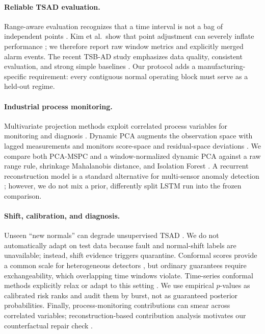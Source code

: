 \documentclass{article}
\begin{document}
\paragraph{Reliable TSAD evaluation.}
Range-aware evaluation recognizes that a time interval is not a bag of independent points \cite{tatbul2018precision}. Kim et al.\ show that point adjustment can severely inflate performance \cite{kim2022rigorous}; we therefore report raw window metrics and explicitly merged alarm events. The recent TSB-AD study emphasizes data quality, consistent evaluation, and strong simple baselines \cite{liu2024elephant}. Our protocol adds a manufacturing-specific requirement: every contiguous normal operating block must serve as a held-out regime.

\paragraph{Industrial process monitoring.}
Multivariate projection methods exploit correlated process variables for monitoring and diagnosis \cite{macgregor1995process}. Dynamic PCA augments the observation space with lagged measurements and monitors score-space and residual-space deviations \cite{ku1995dynamic}. We compare both PCA-MSPC and a window-normalized dynamic PCA against a raw range rule, shrinkage Mahalanobis distance, and Isolation Forest \cite{liu2008isolation}. A recurrent reconstruction model is a standard alternative for multi-sensor anomaly detection \cite{malhotra2016lstm}; however, we do not mix a prior, differently split LSTM run into the frozen comparison.

\paragraph{Shift, calibration, and diagnosis.}
Unseen ``new normals'' can degrade unsupervised TSAD \cite{kim2024newnormals}. We do not automatically adapt on test data because fault and normal-shift labels are unavailable; instead, shift evidence triggers quarantine. Conformal scores provide a common scale for heterogeneous detectors \cite{ishimtsev2017conformal}, but ordinary guarantees require exchangeability, which overlapping time windows violate. Time-series conformal methods explicitly relax or adapt to this setting \cite{zaffran2022adaptive,xu2023sequential}. We use empirical $p$-values as calibrated risk ranks and audit them by burst, not as guaranteed posterior probabilities. Finally, process-monitoring contributions can smear across correlated variables; reconstruction-based contribution analysis motivates our counterfactual repair check \cite{alcala2009reconstruction}.
\end{document}
